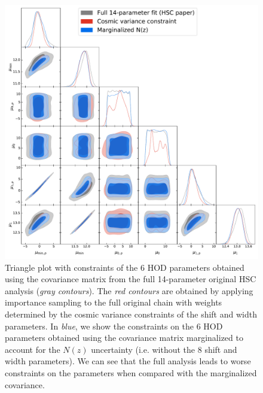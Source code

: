 \documentclass[a4paper,11pt]{article}
\begin{document}
\begin{figure}[ht]
\centering  
\includegraphics[width=1.\textwidth]{./triangle_fid_marg}
\caption{Triangle plot with constraints of 
the 6 HOD parameters obtained using the 
covariance matrix from the full
14-parameter original HSC analysis 
(\textit{gray contours}). The \textit{red
contours} are obtained by applying
importance sampling to the full original 
chain with weights determined by the
cosmic variance constraints of the
shift and width parameters. In \textit{blue},
we show the constraints on the 6 HOD parameters
obtained using the covariance
matrix marginalized to account for the
$N(z)$ uncertainty (i.e. without the
8 shift and width parameters). We can
see that the full analysis leads to 
worse constraints on the parameters
when compared with the marginalized
covariance.}
\label{fig:triangle_fid_marg}
\end{figure}
\end{document}
